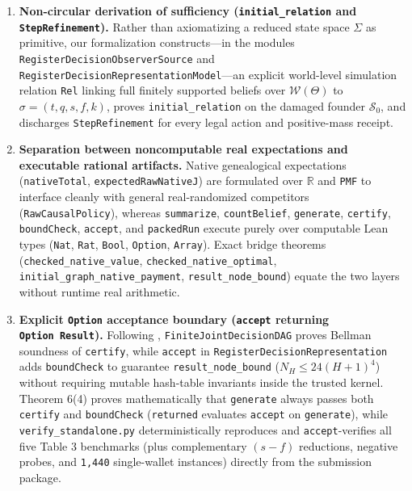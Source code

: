 \documentclass[11pt,letterpaper]{article}
\providecommand{\tightlist}{\setlength{\itemsep}{2pt}\setlength{\parskip}{0pt}}
\begin{document}
\begin{enumerate}
\def\labelenumi{\arabic{enumi}.}
\tightlist
\item
  \textbf{Non-circular derivation of sufficiency
  (\texttt{initial\_relation} and \texttt{StepRefinement}).} Rather than
  axiomatizing a reduced state space \(\Sigma\) as primitive, our
  formalization constructs---in the modules
  \texttt{RegisterDecisionObserverSource} and
  \texttt{RegisterDecisionRepresentationModel}---an explicit world-level
  simulation relation \texttt{Rel} linking full finitely supported
  beliefs over \(\mathcal{W}(\Theta)\) to \(\sigma = (t, q, s, f, k)\),
  proves \texttt{initial\_relation} on the damaged founder
  \(\mathcal{S}_0\), and discharges \texttt{StepRefinement} for every
  legal action and positive-mass receipt.
\item
  \textbf{Separation between noncomputable real expectations and
  executable rational artifacts.} Native genealogical expectations
  (\texttt{nativeTotal}, \texttt{expectedRawNativeJ}) are formulated
  over \(\mathbb{R}\) and \texttt{PMF} to interface cleanly with general
  real-randomized competitors (\texttt{RawCausalPolicy}), whereas
  \texttt{summarize}, \texttt{countBelief}, \texttt{generate},
  \texttt{certify}, \texttt{boundCheck}, \texttt{accept}, and
  \texttt{packedRun} execute purely over computable Lean types
  (\texttt{Nat}, \texttt{Rat}, \texttt{Bool}, \texttt{Option},
  \texttt{Array}). Exact bridge theorems
  (\texttt{checked\_native\_value}, \texttt{checked\_native\_optimal},
  \texttt{initial\_graph\_native\_payment},
  \texttt{result\_node\_bound}) equate the two layers without runtime
  real arithmetic.
\item
  \textbf{Explicit \texttt{Option} acceptance boundary (\texttt{accept}
  returning \texttt{Option\ Result}).} Following \citep{mcconnell2011},
  \texttt{FiniteJointDecisionDAG} proves Bellman soundness of
  \texttt{certify}, while \texttt{accept} in
  \texttt{RegisterDecisionRepresentation} adds \texttt{boundCheck} to
  guarantee \texttt{result\_node\_bound} (\(N_H \le 24(H+1)^4\)) without
  requiring mutable hash-table invariants inside the trusted kernel.
  Theorem 6(4) proves mathematically that \texttt{generate} always
  passes both \texttt{certify} and \texttt{boundCheck}
  (\texttt{returned} evaluates \texttt{accept} on \texttt{generate}),
  while \texttt{verify\_standalone.py} deterministically reproduces and
  \texttt{accept}-verifies all five Table 3 benchmarks (plus
  complementary \((s - f)\) reductions, negative probes, and
  \texttt{1,440} single-wallet instances) directly from the submission
  package.
\end{enumerate}
\end{document}
